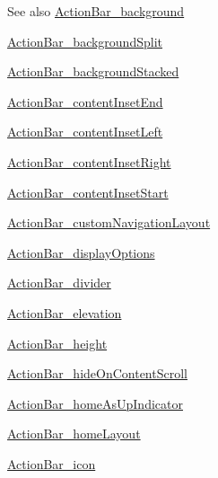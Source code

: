 \begin{DoxySeeAlso}{See also}
\hyperlink{classcheck_1_1test_1_1_r_1_1styleable_a44f8d30ccaef9f5d0d40a81733978053}{Action\+Bar\+\_\+background} 

\hyperlink{classcheck_1_1test_1_1_r_1_1styleable_ab05dbfd1387a947374d7ec306fa7b7a1}{Action\+Bar\+\_\+background\+Split} 

\hyperlink{classcheck_1_1test_1_1_r_1_1styleable_a6cf5689cb912280e627b781eaa714029}{Action\+Bar\+\_\+background\+Stacked} 

\hyperlink{classcheck_1_1test_1_1_r_1_1styleable_a63267bbb6779348e53e468800d19e766}{Action\+Bar\+\_\+content\+Inset\+End} 

\hyperlink{classcheck_1_1test_1_1_r_1_1styleable_af343f343d01cff19f5d4f79c6b1365d8}{Action\+Bar\+\_\+content\+Inset\+Left} 

\hyperlink{classcheck_1_1test_1_1_r_1_1styleable_a2e6574bce599da88fada999852ecddff}{Action\+Bar\+\_\+content\+Inset\+Right} 

\hyperlink{classcheck_1_1test_1_1_r_1_1styleable_a4c5e7ea9ebcd8ec777039551daa8f3f5}{Action\+Bar\+\_\+content\+Inset\+Start} 

\hyperlink{classcheck_1_1test_1_1_r_1_1styleable_ae4307a4bd959bb1787eb44b851f56578}{Action\+Bar\+\_\+custom\+Navigation\+Layout} 

\hyperlink{classcheck_1_1test_1_1_r_1_1styleable_a24df28f3ee73a49d2b813abaabda3b5b}{Action\+Bar\+\_\+display\+Options} 

\hyperlink{classcheck_1_1test_1_1_r_1_1styleable_a0d32a23092ef9676e80af1baef491e9b}{Action\+Bar\+\_\+divider} 

\hyperlink{classcheck_1_1test_1_1_r_1_1styleable_a04317e16738cdda5538f180e12395b7c}{Action\+Bar\+\_\+elevation} 

\hyperlink{classcheck_1_1test_1_1_r_1_1styleable_a1ad8ab9094975d894200659bb15e67fd}{Action\+Bar\+\_\+height} 

\hyperlink{classcheck_1_1test_1_1_r_1_1styleable_a62a234e7f0069b54f7bc50a087a598a6}{Action\+Bar\+\_\+hide\+On\+Content\+Scroll} 

\hyperlink{classcheck_1_1test_1_1_r_1_1styleable_a84fd3d85c1d60971f8574c3b4809433a}{Action\+Bar\+\_\+home\+As\+Up\+Indicator} 

\hyperlink{classcheck_1_1test_1_1_r_1_1styleable_a2036cd83e6c7153acfac1a87f273dbe5}{Action\+Bar\+\_\+home\+Layout} 

\hyperlink{classcheck_1_1test_1_1_r_1_1styleable_a59d128f0d74801dcc8e66e1748460fed}{Action\+Bar\+\_\+icon} 


\end{DoxySeeAlso}
